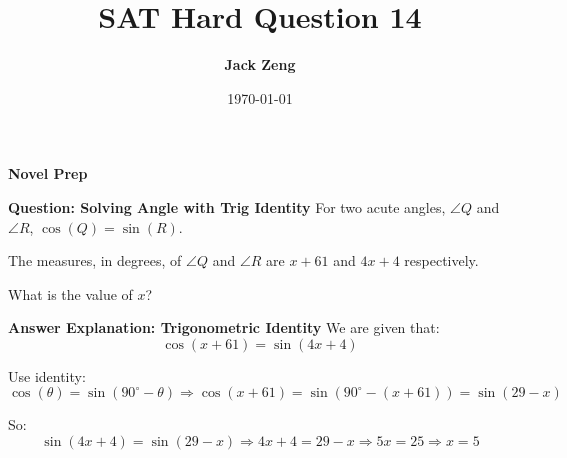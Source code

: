 \documentclass{beamer}
\title[SAT Hard Question]{\textbf{SAT Hard Question 14}}
\author{\textbf{Jack Zeng}}
\institute{\textcolor{white}{\textbf{Novel Prep}}}
\date{\today}
\begin{document}
\begin{frame}
    \titlepage
    \vfill
    \begin{flushright}
        \textcolor{purpleblue}{\Huge \textbf{Novel Prep}}
    \end{flushright}
\end{frame}


\begin{frame}
\end{frame}

\begin{frame}{\textbf{Question: Solving Angle with Trig Identity}}
\small
For two acute angles, $\angle Q$ and $\angle R$, $\cos(Q) = \sin(R)$.

The measures, in degrees, of $\angle Q$ and $\angle R$ are $x + 61$ and $4x + 4$ respectively.

What is the value of $x$?
\end{frame}

\begin{frame}{\textbf{Answer Explanation: Trigonometric Identity}}
\small
We are given that:
\[
\cos(x + 61) = \sin(4x + 4)
\]

Use identity:
\[
\cos(\theta) = \sin(90^\circ - \theta)
\Rightarrow \cos(x + 61) = \sin(90^\circ - (x + 61)) = \sin(29 - x)
\]

So:
\[
\sin(4x + 4) = \sin(29 - x)
\Rightarrow 4x + 4 = 29 - x
\Rightarrow 5x = 25
\Rightarrow x = 5
\]
\end{frame}
\end{document}
